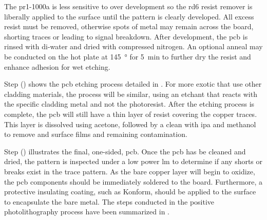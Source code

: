 \documentclass[../../main.tex]{subfiles}
\begin{document}
    The \gls{pr1-1000a} is less sensitive to over development so the \gls{rd6} resist remover is liberally applied to the surface until the pattern is clearly developed.
    All excess resist must be removed, otherwise spots of metal may remain across the board, shorting traces or leading to signal breakdown.
    After development, the \gls{pcb} is rinsed with \gls{di-water} and dried with compressed nitrogen.
    An optional anneal may be conducted on the hot plate at \SI{145}{\degree} for \SI{5}{\minute} to further dry the resist and enhance adhesion for wet etching.
    \par%
    Step () shows the \gls{pcb} etching process detailed in .
    For more exotic  that use other cladding materials, the process will be similar, using an etchant that reacts with the specific cladding metal and not the photoresist.
    After the etching process is complete, the \gls{pcb} will still have a thin layer of resist covering the copper traces.
    This layer is dissolved using \gls{acetone}, followed by a clean with \gls{ipa} and \gls{methanol} to remove and surface films and remaining contamination.
    \par%
    Step () illustrates the final, one-sided, \gls{pcb}.
    Once the \gls{pcb} has be cleaned and dried, the pattern is inspected under a low power \gls{lm} to determine if any shorts or breaks exist in the trace pattern.
    As the bare copper layer will begin to oxidize, the \gls{pcb} components should be immediately soldered to the board.
    Furthermore, a protective insulating coating, such as Konform, should be applied to the surface to encapsulate the bare metal.
    The steps conducted in the positive photolithography process have been summarized in .
\end{document}

